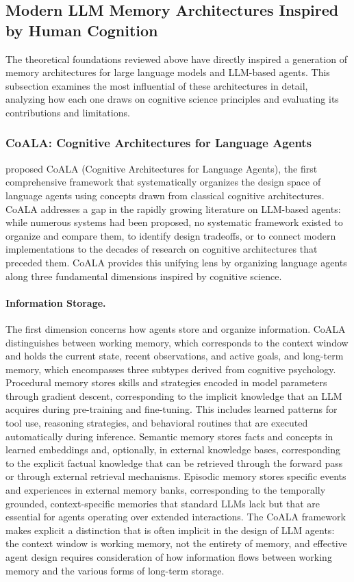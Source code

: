 \documentclass[11pt,letterpaper]{article}
\begin{document}
\subsection{Modern LLM Memory Architectures Inspired by Human Cognition}

The theoretical foundations reviewed above have directly inspired a generation of memory architectures for large language models and LLM-based agents. This subsection examines the most influential of these architectures in detail, analyzing how each one draws on cognitive science principles and evaluating its contributions and limitations.

\subsubsection{CoALA: Cognitive Architectures for Language Agents}

\cite{sumers2024cognitive} proposed CoALA (Cognitive Architectures for Language Agents), the first comprehensive framework that systematically organizes the design space of language agents using concepts drawn from classical cognitive architectures. CoALA addresses a gap in the rapidly growing literature on LLM-based agents: while numerous systems had been proposed, no systematic framework existed to organize and compare them, to identify design tradeoffs, or to connect modern implementations to the decades of research on cognitive architectures that preceded them. CoALA provides this unifying lens by organizing language agents along three fundamental dimensions inspired by cognitive science.

\paragraph{Information Storage.} The first dimension concerns how agents store and organize information. CoALA distinguishes between working memory, which corresponds to the context window and holds the current state, recent observations, and active goals, and long-term memory, which encompasses three subtypes derived from cognitive psychology. Procedural memory stores skills and strategies encoded in model parameters through gradient descent, corresponding to the implicit knowledge that an LLM acquires during pre-training and fine-tuning. This includes learned patterns for tool use, reasoning strategies, and behavioral routines that are executed automatically during inference. Semantic memory stores facts and concepts in learned embeddings and, optionally, in external knowledge bases, corresponding to the explicit factual knowledge that can be retrieved through the forward pass or through external retrieval mechanisms. Episodic memory stores specific events and experiences in external memory banks, corresponding to the temporally grounded, context-specific memories that standard LLMs lack but that are essential for agents operating over extended interactions. The CoALA framework makes explicit a distinction that is often implicit in the design of LLM agents: the context window is working memory, not the entirety of memory, and effective agent design requires consideration of how information flows between working memory and the various forms of long-term storage.
\end{document}
